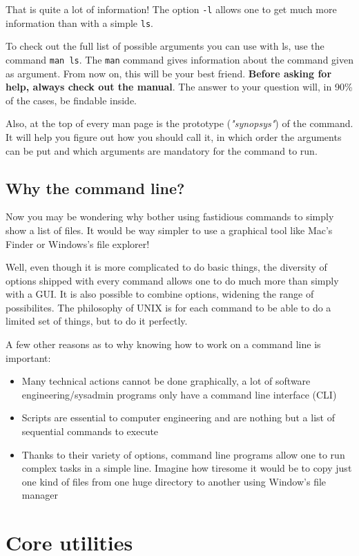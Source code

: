 \documentclass[12pt]{article}
\begin{document}
That is quite a lot of information! The option \texttt{-l} allows one to get much more information than with a simple \texttt{ls}.

To check out the full list of possible arguments you can use with ls, use the command \texttt{man ls}.
The \texttt{man} command gives information about the command given as argument. From now on, this will be your best friend. \textbf{Before asking for help, always check out the manual}. The answer to your question will, in 90\% of the cases, be findable inside.

Also, at the top of every man page is the prototype (\textit{"synopsys"}) of the command. It will help you figure out how you should call it, in which order the arguments can be put and which arguments are mandatory for the command to run.

\subsection{Why the command line?}

Now you may be wondering why bother using fastidious commands to simply show a list of files. It would be way simpler to use a graphical tool like Mac's Finder or Windows's file explorer!

Well, even though it is more complicated to do basic things, the diversity of options shipped with every command allows one to do much more than simply with a GUI.
It is also possible to combine options, widening the range of possibilites.
The philosophy of UNIX is for each command to be able to do a limited set of things, but to do it perfectly.

A few other reasons as to why knowing how to work on a command line is important:
\begin{itemize}
\item Many technical actions cannot be done graphically, a lot of software engineering/sysadmin programs only have a command line interface (CLI)
\item Scripts are essential to computer engineering and are nothing but a list of sequential commands to execute
\item Thanks to their variety of options, command line programs allow one to run complex tasks in a simple line. Imagine how tiresome it would be to copy just one kind of files from one huge directory to another using Window's file manager
\end{itemize}


\section{Core utilities}
\end{document}
